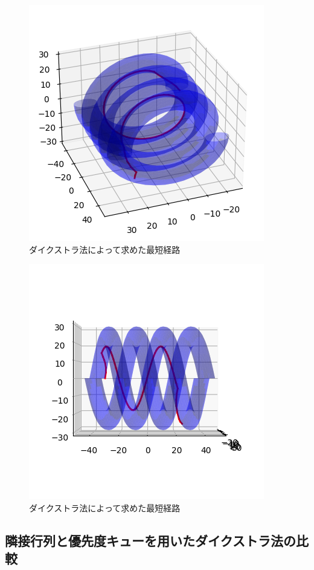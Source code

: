 \documentclass[a4paper,11pt]{jsarticle}
\begin{document}
\begin{figure}[H]
  \centering
  \includegraphics[scale = 1.0]{../Figs/helix-0to634-1.png} 
  \caption{ダイクストラ法によって求めた最短経路}
  \label{helix-path1}
\end{figure}

\begin{figure}[H]
  \centering
  \includegraphics[scale = 1.0]{../Figs/helix-0to634-2.png} 
  \caption{ダイクストラ法によって求めた最短経路}
  \label{helix-path2}
\end{figure}

\subsection{隣接行列と優先度キューを用いたダイクストラ法の比較}
\end{document}
